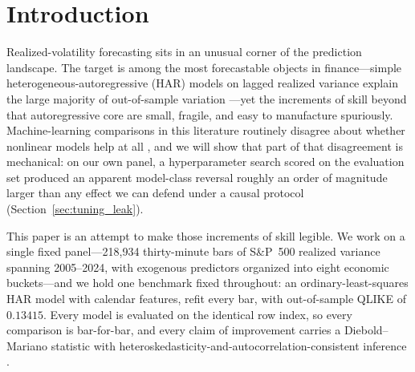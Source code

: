 \section{Introduction}
\label{sec:introduction}

Realized-volatility forecasting sits in an unusual corner of the prediction landscape. The target is among the most forecastable objects in finance---simple heterogeneous-autoregressive (HAR) models on lagged realized variance explain the large majority of out-of-sample variation \citep{Corsi2009, AndersenBollerslevDieboldLabys2003}---yet the increments of skill beyond that autoregressive core are small, fragile, and easy to manufacture spuriously. Machine-learning comparisons in this literature routinely disagree about whether nonlinear models help at all \citep{christensen2023machine, gu2020empirical}, and we will show that part of that disagreement is mechanical: on our own panel, a hyperparameter search scored on the evaluation set produced an apparent model-class reversal roughly an order of magnitude larger than any effect we can defend under a causal protocol (Section~\ref{sec:tuning_leak}).

This paper is an attempt to make those increments of skill legible. We work on a single fixed panel---218{,}934 thirty-minute bars of S\&P~500 realized variance spanning 2005--2024, with exogenous predictors organized into eight economic buckets---and we hold one benchmark fixed throughout: an ordinary-least-squares HAR model with calendar features, refit every bar, with out-of-sample QLIKE of $0.13415$. Every model is evaluated on the identical row index, so every comparison is bar-for-bar, and every claim of improvement carries a Diebold--Mariano statistic with heteroskedasticity-and-autocorrelation-consistent inference \citep{DieboldMariano1995, HarveyLeybourneNewbold1997}.

